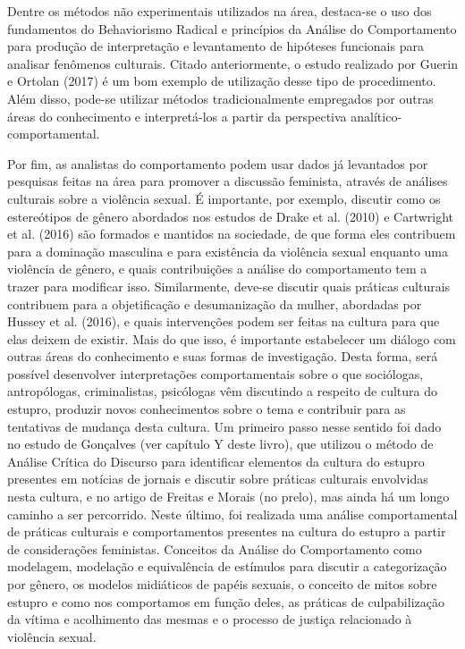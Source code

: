 Dentre os métodos não experimentais utilizados na área, destaca-se o uso dos fundamentos do Behaviorismo Radical e princípios da Análise do Comportamento para produção de interpretação e levantamento de hipóteses funcionais para analisar fenômenos culturais. Citado anteriormente, o estudo realizado por Guerin e Ortolan (2017) é um bom exemplo de utilização desse tipo de procedimento. Além disso, pode-se utilizar métodos tradicionalmente empregados por outras áreas do conhecimento e interpretá-los a partir da perspectiva analítico-comportamental.

Por fim, as analistas do comportamento podem usar dados já levantados por pesquisas feitas na área para promover a discussão feminista, através de análises culturais sobre a violência sexual. É importante, por exemplo, discutir como os estereótipos de gênero abordados nos estudos de Drake et al. (2010) e Cartwright et al. (2016) são formados e mantidos na sociedade, de que forma eles contribuem para a dominação masculina e para existência da violência sexual enquanto uma violência de gênero, e quais contribuições a análise do comportamento tem a trazer para modificar isso. Similarmente, deve-se discutir quais práticas culturais contribuem para a objetificação e desumanização da mulher, abordadas por Hussey et al. (2016), e quais intervenções podem ser feitas na cultura para que elas deixem de existir. Mais do que isso, é importante estabelecer um diálogo com outras áreas do conhecimento e suas formas de investigação. Desta forma, será possível desenvolver interpretações comportamentais sobre o que sociólogas, antropólogas, criminalistas, psicólogas vêm discutindo a respeito de cultura do estupro, produzir novos conhecimentos sobre o tema e contribuir para as tentativas de mudança desta cultura. Um primeiro passo nesse sentido foi dado no estudo de Gonçalves (ver capítulo Y deste livro), que utilizou o método de Análise Crítica do Discurso para identificar elementos da cultura do estupro presentes em notícias de jornais e discutir sobre práticas culturais envolvidas nesta cultura, e no artigo de Freitas e Morais (no prelo), mas ainda há um longo caminho a ser percorrido. Neste último, foi realizada uma análise comportamental de práticas culturais e comportamentos presentes na cultura do estupro a partir de considerações feministas. Conceitos da Análise do Comportamento como modelagem, modelação e equivalência de estímulos para discutir a categorização por gênero, os modelos midiáticos de papéis sexuais, o conceito de mitos sobre estupro e como nos comportamos em função deles, as práticas de culpabilização da vítima e acolhimento das mesmas e o processo de justiça relacionado à violência sexual.

